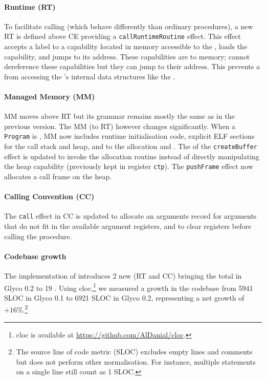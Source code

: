 \documentclass[main.tex]{subfiles}
\begin{document}
\paragraph{Runtime (RT)} To facilitate calling  (which behave differently than ordinary procedures), a new  RT is defined above CE providing a \texttt{callRuntimeRoutine} effect. This effect accepts a label to a capability located in memory accessible to the , loads the capability, and jumps to its address. These capabilities are  to  memory;  cannot dereference these capabilities but they can jump to their address. This prevents a  from accessing the 's internal data structures like the .

\paragraph{Managed Memory (MM)} MM moves above RT but its grammar remains mostly the same as in the previous version. The MM (to RT)  however changes significantly. When a \texttt{Program} is \lowered{}, MM now includes runtime initialisation code, explicit ELF sections for the call stack and heap, and  to the allocation and  . The  of the \texttt{createBuffer} effect is updated to invoke the allocation routine instead of directly manipulating the heap capability (previously kept in register \texttt{ctp}). The \texttt{pushFrame} effect now allocates a call frame on the heap.

\paragraph{Calling Convention (CC)} The \texttt{call} effect in CC is updated to allocate an arguments record for arguments that do not fit in the available argument registers, and to clear registers before calling the procedure.

\paragraph{Codebase growth} The implementation of  introduces 2 new  (RT and CC) bringing the total in Glyco 0.2 to 19 . Using cloc,\footnote{cloc is available at \url{https://github.com/AlDanial/cloc}.} we measured a growth in the codebase from 5941 SLOC in Glyco 0.1 to 6921 SLOC in Glyco 0.2, representing a net growth of $+16\%$.\footnote{The source line of code metric (SLOC) excludes empty lines and comments but does not perform other normalisation. For instance, multiple statements on a single line still count as 1 SLOC.}
\end{document}
